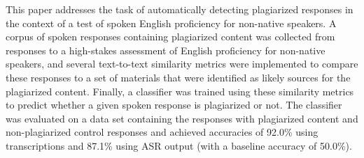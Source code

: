 This paper addresses the task of automatically detecting plagiarized responses in the context of a test of spoken English proficiency for non-native speakers. A corpus of spoken responses containing plagiarized content was collected from responses to a high-stakes assessment of English proficiency for non-native speakers, and several text-to-text similarity metrics were implemented to compare these responses to a set of materials that were identified as likely sources for the plagiarized content.  Finally, a classifier was trained using these similarity metrics to predict whether a given spoken response is plagiarized or not.  The classifier was evaluated on a data set containing the responses with plagiarized content and non-plagiarized control responses and achieved accuracies of 92.0\% using transcriptions and 87.1\% using ASR output (with a baseline accuracy of 50.0\%).
